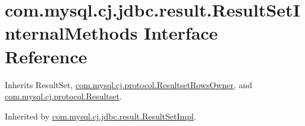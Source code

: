 \hypertarget{interfacecom_1_1mysql_1_1cj_1_1jdbc_1_1result_1_1_result_set_internal_methods}{}\section{com.\+mysql.\+cj.\+jdbc.\+result.\+Result\+Set\+Internal\+Methods Interface Reference}
\label{interfacecom_1_1mysql_1_1cj_1_1jdbc_1_1result_1_1_result_set_internal_methods}


Inherits Result\+Set, \mbox{\hyperlink{interfacecom_1_1mysql_1_1cj_1_1protocol_1_1_resultset_rows_owner}{com.\+mysql.\+cj.\+protocol.\+Resultset\+Rows\+Owner}}, and \mbox{\hyperlink{interfacecom_1_1mysql_1_1cj_1_1protocol_1_1_resultset}{com.\+mysql.\+cj.\+protocol.\+Resultset}}.



Inherited by \mbox{\hyperlink{classcom_1_1mysql_1_1cj_1_1jdbc_1_1result_1_1_result_set_impl}{com.\+mysql.\+cj.\+jdbc.\+result.\+Result\+Set\+Impl}}.

